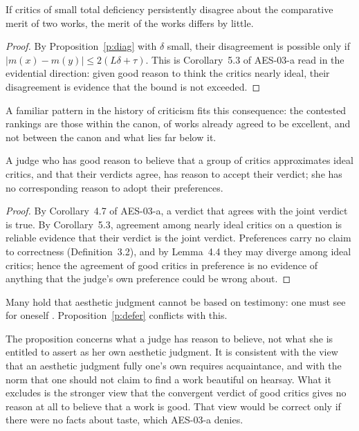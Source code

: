 \documentclass{situationist-preprint}
\begin{document}
\begin{proposition}\label{p:close}
If critics of small total deficiency persistently disagree about the comparative merit of two works, the merit of the works differs by little.
\end{proposition}

\begin{proof}
By Proposition~\ref{p:diag} with $\delta$ small, their disagreement is possible only if $|m(x)-m(y)|\le 2(L\delta+\tau)$. This is Corollary~5.3 of AES-03-a read in the evidential direction: given good reason to think the critics nearly ideal, their disagreement is evidence that the bound is not exceeded.
\end{proof}

A familiar pattern in the history of criticism fits this consequence: the contested rankings are those within the canon, of works already agreed to be excellent, and not between the canon and what lies far below it.

\begin{proposition}[Deference]\label{p:defer}
A judge who has good reason to believe that a group of critics approximates ideal critics, and that their verdicts agree, has reason to accept their verdict; she has no corresponding reason to adopt their preferences.
\end{proposition}

\begin{proof}
By Corollary~4.7 of AES-03-a, a verdict that agrees with the joint verdict is true. By Corollary~5.3, agreement among nearly ideal critics on a question is reliable evidence that their verdict is the joint verdict. Preferences carry no claim to correctness (Definition~3.2), and by Lemma~4.4 they may diverge among ideal critics; hence the agreement of good critics in preference is no evidence of anything that the judge's own preference could be wrong about.
\end{proof}

\begin{objection}[Testimony]
Many hold that aesthetic judgment cannot be based on testimony: one must see for oneself \citep{Hopkins2011}. Proposition~\ref{p:defer} conflicts with this.
\end{objection}

\begin{reply}
The proposition concerns what a judge has reason to believe, not what she is entitled to assert as her own aesthetic judgment. It is consistent with the view that an aesthetic judgment fully one's own requires acquaintance, and with the norm that one should not claim to find a work beautiful on hearsay. What it excludes is the stronger view that the convergent verdict of good critics gives no reason at all to believe that a work is good. That view would be correct only if there were no facts about taste, which AES-03-a denies.
\end{reply}
\end{document}
